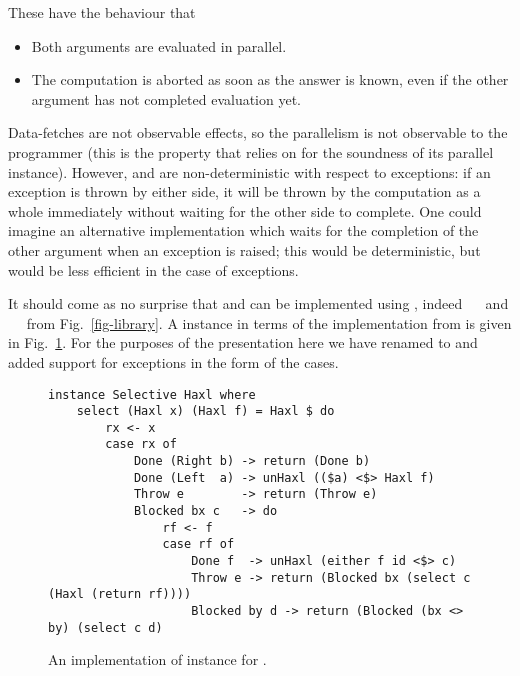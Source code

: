 \noindent
These have the behaviour that

\begin{itemize}
\item Both arguments are evaluated in parallel.
\item The computation is aborted as soon as the answer is known, even
    if the other argument has not completed evaluation yet.
\end{itemize}

Data-fetches are not observable effects, so the parallelism is not
observable to the programmer (this is the property that \Haxl relies
on for the soundness of its parallel 
instance). However,  and  are non-deterministic with
respect to exceptions: if an exception is thrown by either side, it
will be thrown by the computation as a whole immediately without
waiting for the other side to complete.  One could imagine an
alternative implementation which waits for the completion of the other
argument when an exception is raised; this would be deterministic, but
would be less efficient in the case of exceptions.

It should come as no surprise that  and  can be
implemented using , indeed ~\hs{=}~\hs{(<||>)} and
~\hs{=}~\hs{(<&&>)} from Fig.~\ref{fig-library}. A 
instance in terms of the \Haxl implementation from \citet{marlow2014haxl} is
given in Fig.~\ref{fig-haxl-select}.  For the purposes of the presentation
here we have renamed  to  and added support for
exceptions in the form of the  cases.

\begin{figure}
\begin{verbatim}
instance Selective Haxl where
    select (Haxl x) (Haxl f) = Haxl $ do
        rx <- x
        case rx of
            Done (Right b) -> return (Done b)
            Done (Left  a) -> unHaxl (($a) <$> Haxl f)
            Throw e        -> return (Throw e)
            Blocked bx c   -> do
                rf <- f
                case rf of
                    Done f  -> unHaxl (either f id <$> c)
                    Throw e -> return (Blocked bx (select c (Haxl (return rf))))
                    Blocked by d -> return (Blocked (bx <> by) (select c d)
\end{verbatim}
\caption{An implementation of  instance for \Haxl.}
\label{fig-haxl-select}
\end{figure}

